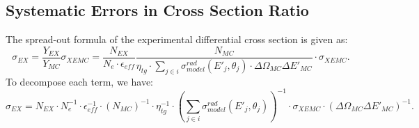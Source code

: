   \clearpage
\subsection{Systematic Errors in Cross Section Ratio}

The spread-out formula of the experimental differential cross section is given as:
\begin{equation}
  \sigma_{EX} = \frac{Y_{EX}}{Y_{MC}}\sigma_{XEMC}=\frac{N_{EX}}{N_{e}\cdot \epsilon_{eff}} \frac{N_{MC}}{\eta_{tg}\cdot \sum_{j\in i}\sigma^{rad}_{model}(E'_{j},\theta_{j}) \cdot \Delta\Omega_{MC} \Delta E'_{MC}}\cdot\sigma_{XEMC}.
\end{equation}
To decompose each term, we have:
\begin{equation}
 \sigma_{EX} = N_{EX}\cdot N_{e}^{-1}\cdot \epsilon_{eff}^{-1}\cdot (N_{MC})^{-1}\cdot\eta_{tg}^{-1}\cdot (\sum_{j\in i}\sigma^{rad}_{model}(E'_{j},\theta_{j}))^{-1}\cdot\sigma_{XEMC}\cdot (\Delta\Omega_{MC} \Delta E'_{MC})^{-1}.
\end{equation}

